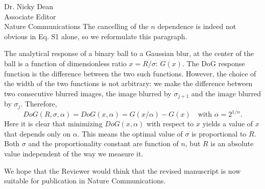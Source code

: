 \documentclass[a4paper, rebuttal, parskip=true, firsthead=false, fromemail=true, foldmarks=false]{scrlttr2}
\begin{document}
\begin{letter}{Dr. Nicky Dean\\
Associate Editor\\
Nature Communications}
The cancelling of the $n$ dependence is indeed not obvious in Eq. S1 alone, so we reformulate this paragraph.

The analytical response of a binary ball to a Gaussian blur, at the center of the ball is a function of dimensionless ratio $x=R/\sigma$: $G(x)$. The DoG response function is the difference between the two such functions. However, the choice of the width of the two functions is not arbitrary: we make the difference between two consecutive blurred images, the image blurred by $\sigma_{j+1}$ and the image blurred by $\sigma_j$. Therefore, 
\[
DoG(R,\sigma, \alpha) = DoG(x, \alpha) = G(x/\alpha) - G(x) \quad\text{with }\alpha=2^{1/n}.
\]
Here it is clear that minimizing $DoG(x, \alpha)$ with respect to $x$ yields a value of $x$ that depends only on $\alpha$. This means the optimal value of $\sigma$ is proportional to $R$.  Both $\sigma$ and the proportionality constant are function of $n$, but $R$ is an absolute value independent of the way we measure it.

We hope that the Reviewer would think that the revised manuscript is now suitable for publication in Nature Communications. 


\end{letter} 
\end{document}
